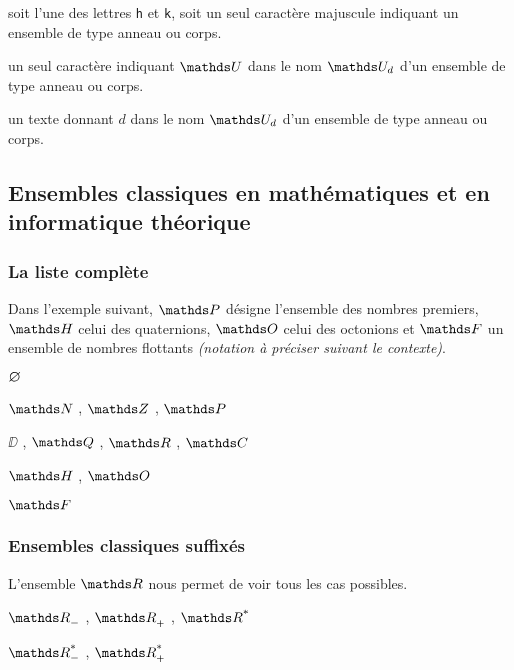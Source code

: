 \documentclass[12pt,a4paper]{article}
\begin{document}

\IDarg{} soit l'une des lettres  \texttt{h} et \texttt{k}, soit un seul caractère \ascii{} majuscule indiquant un ensemble de type anneau ou corps.


\separation



 un seul caractère \ascii{} indiquant $\setalge{U}$ dans le nom $\setalge*{U}{d}$ d'un ensemble de type anneau ou corps.

 un texte donnant $d$ dans le nom $\setalge*{U}{d}$ d'un ensemble de type anneau ou corps.




\subsection{Ensembles classiques en mathématiques et en informatique théorique} \label{tnssets-classical-sets}

\subsubsection{La liste complète}

Dans l'exemple suivant,
$\PP$ désigne l'ensemble des nombres premiers,
$\HH$ celui des quaternions,
$\OO$ celui des octonions et
$\FF$ un ensemble de nombres flottants \emph{(notation à préciser suivant le contexte)}.

\begin{latexex}
$\nullset$

$\NN$ , $\ZZ$ , $\PP$

$\DD$ , $\QQ$ , $\RR$ , $\CC$

$\HH$ , $\OO$

$\FF$
\end{latexex}




\subsubsection{Ensembles classiques suffixés}

L'ensemble $\RR$ nous permet de voir tous les cas possibles. 

\begin{latexex}
$\RRn$ , $\RRp$ , $\RRs$ 

$\RRsn$ , $\RRsp$
\end{latexex}
\end{document}
